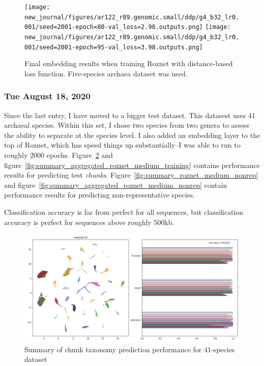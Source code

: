 \documentclass{article}
\begin{document}
\begin{figure}
  \texttt{[image: new\_journal/figures/ar122\_r89.genomic.small/ddp/g4\_b32\_lr0.001/seed=2001-epoch=80-val\_loss=2.98.outputs.png]}
  \texttt{[image: new\_journal/figures/ar122\_r89.genomic.small/ddp/g4\_b32\_lr0.001/seed=2001-epoch=95-val\_loss=3.98.outputs.png]}
  \caption{Final embedding results when training Roznet with distance-based loss function. Five-species archaea dataset was used.  }
  \label{fig:g4_b32_lr0.001}
\end{figure}



\subsubsection*{Tue August 18, 2020}
Since the last entry, I have moved to a bigger test dataset. This datasest uses 41 archaeal species. Within this set, I chose two species from two genera to assess
the ability to separate at the species level. I also added an embedding layer to the top of Roznet, which has speed things up substantially--I was able to run to
roughly 2000 epochs. Figure~\ref{fig:summary_roznet_medium_training} and figure~\ref{fig:summary_aggregated_roznet_medium_training} contains performance results for predicting test \emph{chunks}.
Figure~\ref{fig:summary_roznet_medium_nonrep} and figure~\ref{fig:summary_aggregated_roznet_medium_nonrep} contain performance results for predicting non-representative species.

Classification accuracy is far from perfect for all sequences, but classification accuracy is perfect for sequences above roughly 500kb.

\begin{figure}
  \includegraphics[width=\linewidth]{figures/ar122_r89.genomic.medium/chunks_W4000_S4000/roznet/o256_g4_b32_lr0.001_16bit_A4/summary.png}
  \caption{Summary of chunk taxonomy prediction performance for 41-species dataset}
  \label{fig:summary_roznet_medium_training}
\end{figure}
\end{document}
